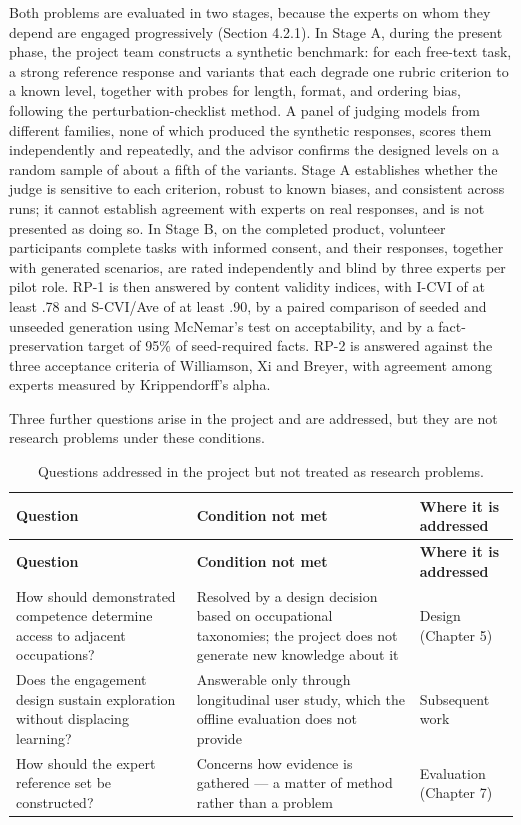 Both problems are evaluated in two stages, because the experts on whom they depend are engaged progressively (Section 4.2.1). In Stage A, during the present phase, the project team constructs a synthetic benchmark: for each free-text task, a strong reference response and variants that each degrade one rubric criterion to a known level, together with probes for length, format, and ordering bias, following the perturbation-checklist method\cite{r73}. A panel of judging models from different families, none of which produced the synthetic responses, scores them independently and repeatedly\cite{r74}, and the advisor confirms the designed levels on a random sample of about a fifth of the variants. Stage A establishes whether the judge is sensitive to each criterion, robust to known biases, and consistent across runs; it cannot establish agreement with experts on real responses, and is not presented as doing so. In Stage B, on the completed product, volunteer participants complete tasks with informed consent, and their responses, together with generated scenarios, are rated independently and blind by three experts per pilot role. RP-1 is then answered by content validity indices, with I-CVI of at least .78 and S-CVI/Ave of at least .90\cite{r70}, by a paired comparison of seeded and unseeded generation using McNemar's test on acceptability, and by a fact-preservation target of 95\% of seed-required facts. RP-2 is answered against the three acceptance criteria of Williamson, Xi and Breyer\cite{r71}, with agreement among experts measured by Krippendorff's alpha\cite{r72}.

Three further questions arise in the project and are addressed, but they are not research problems under these conditions.

{\small
\begin{longtable}{|>{\raggedright\arraybackslash}p{}|>{\raggedright\arraybackslash}p{}|>{\raggedright\arraybackslash}p{}|}
\caption{Questions addressed in the project but not treated as research problems.} \\
\hline
\textbf{Question} & \textbf{Condition not met} & \textbf{Where it is addressed} \\ \hline
\endfirsthead
\hline
\textbf{Question} & \textbf{Condition not met} & \textbf{Where it is addressed} \\ \hline
\endhead
How should demonstrated competence determine access to adjacent occupations? & Resolved by a design decision based on occupational taxonomies; the project does not generate new knowledge about it & Design (Chapter 5) \\ \hline
Does the engagement design sustain exploration without displacing learning? & Answerable only through longitudinal user study, which the offline evaluation does not provide & Subsequent work \\ \hline
How should the expert reference set be constructed? & Concerns how evidence is gathered --- a matter of method rather than a problem & Evaluation (Chapter 7) \\ \hline
\end{longtable}
}

